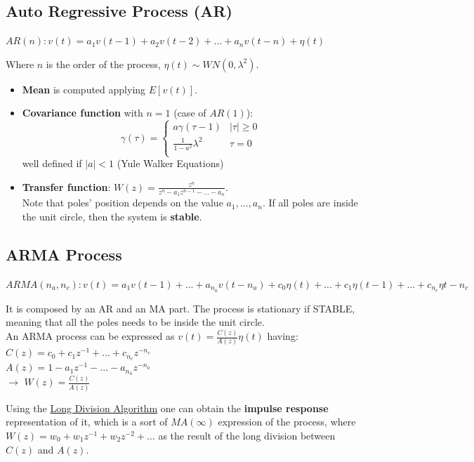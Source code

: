\documentclass[10pt,a4paper]{article}
\begin{document}
\subsection{Auto Regressive Process (AR)}
\center 
$AR(n) : v(t) = a_1v(t-1)+a_2v(t-2)+...+a_nv(t-n) + \eta(t)$
\\
\vspace{0.5em}
\raggedright
Where $n$ is the order of the process, $\eta(t) \sim WN(0,\lambda^2)$. \\
\begin{itemize}
	\item \textbf{Mean} is computed applying $E[v(t)]$.
	\item \textbf{Covariance function} with $n=1$ (case of $AR(1)$):
	\begin{equation}
  		\gamma(\tau) =
    		\begin{cases}
      			a\gamma(\tau-1) & |\tau| \geq 0\\
      			\frac{1}{1-a^2} \lambda^2 & \tau=0\\
    \end{cases}       
\end{equation}
	well defined if $|a|<1$ (Yule Walker Equations)
	\item \textbf{Transfer function}: $W(z)=\frac{z^n}{z^n-a_1z^{n-1}-...-a_n}$. \\
	\vspace{0.5em}
	Note that poles' position depends on the value $a_1, ..., a_n$. If all poles are inside the unit circle, then the system is \textbf{stable}.
\end{itemize}
\subsection{ARMA Process}
\center 
$ARMA(n_a,n_c) : v(t) = a_1v(t-1)+...+a_{n_a}v(t-n_a) + c_0\eta(t) + ... + c_1\eta(t-1) + ... + c_{n_c}\eta{t-n_c}$
\\
\vspace{1em}
\raggedright
It is composed by an AR and an MA part. The process is stationary if STABLE, meaning that all the poles needs to be inside the unit circle. \\
An ARMA process can be expressed as $v(t)=\frac{C(z)}{A(z)}\eta(t)$ having:
\center
 $C(z)=c_0+c_1z^{-1}+...+c_{n_c}z^{-n_c}$\\ $A(z)=1-a_1z^{-1}-...-a_{n_a}z^{-n_a}$
 \\
$\rightarrow$ $W(z) = \frac{C(z)}{A(z)}$
\\ \raggedright \vspace{0.5em}
Using the \uline{Long Division Algorithm} one can obtain the \textbf{impulse response} representation of it, which is a sort of $MA(\infty)$ expression of the process, where $W(z)=w_0+w_1z^{-1}+w_2z^{-2}+...$ as the result of the long division between $C(z)$ and $A(z)$.
\pagebreak
\end{document}
